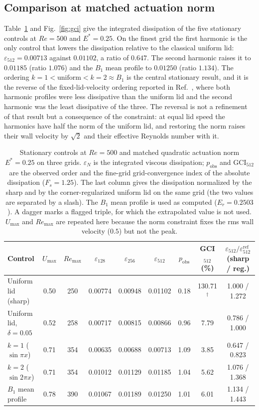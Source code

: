 \documentclass[11pt,a4paper]{article}
\begin{document}
\subsection{Comparison at matched actuation norm}

Table~\ref{tab:stationary} and Fig.~\ref{fig:gci} give the integrated dissipation
of the five stationary controls at $Re=500$ and $E^\ast=0.25$. On the finest grid
the first harmonic is the only control that lowers the dissipation relative to the
classical uniform lid: $\varepsilon_{512}=0.00713$ against
$0.01102$, a ratio of $0.647$. The second harmonic raises it to $0.01185$
(ratio $1.076$) and the $B_1$ mean profile to $0.01250$ (ratio $1.134$). The
ordering $k=1<\text{uniform}<k=2\approx B_1$ is the central stationary result, and
it is the reverse of the fixed-lid-velocity ordering reported in
Ref.~\cite{beniaiche2026}, where both harmonic profiles were less dissipative than
the uniform lid and the second harmonic was the least dissipative of the three.
The reversal is not a refinement of that result but a consequence of the
constraint: at equal lid speed the harmonics have half the norm of the uniform
lid, and restoring the norm raises their wall velocity by $\sqrt2$ and their
effective Reynolds number with it.

\begin{table}[t]
\centering
\caption{Stationary controls at $Re=500$ and matched quadratic actuation norm
$E^\ast=0.25$ on three grids. $\varepsilon_N$ is the integrated viscous
dissipation; $p_{\mathrm{obs}}$ and $\mathrm{GCI}_{512}$ are the observed order
and the fine-grid grid-convergence index of the absolute dissipation
($F_s=1.25$). The last column gives the dissipation normalized by the sharp
and by the corner-regularized uniform lid on the same grid (the two values are
separated by a slash). The $B_1$ mean profile
is used as computed ($E_r=0.2503$). A dagger marks a flagged triple, for which
the extrapolated value is not used. $U_{\max}$ and $Re_{\max}$ are repeated here
because the norm constraint fixes the rms wall velocity ($0.5$) but not the peak.}
\label{tab:stationary}
\footnotesize
\setlength{\tabcolsep}{4pt}
\begin{tabular}{lcccccccc}
\toprule
Control & $U_{\max}$ & $Re_{\max}$ & $\varepsilon_{128}$ & $\varepsilon_{256}$ & $\varepsilon_{512}$
& $p_{\mathrm{obs}}$ & GCI$_{512}$ (\%) & $\varepsilon_{512}/\varepsilon^{\mathrm{ref}}_{512}$ (sharp / reg.)\\
\midrule
Uniform lid (sharp) & 0.50 & 250 & 0.00774 & 0.00948 & 0.01102 & 0.18 & 130.71$^{\dagger}$ & 1.000 / 1.272\\
Uniform lid, $\delta=0.05$ & 0.52 & 258 & 0.00717 & 0.00815 & 0.00866 & 0.96 & 7.79 & 0.786 / 1.000\\
$k=1$ ($\sin\pi x$) & 0.71 & 354 & 0.00635 & 0.00688 & 0.00713 & 1.09 & 3.85 & 0.647 / 0.823\\
$k=2$ ($\sin 2\pi x$) & 0.71 & 354 & 0.01012 & 0.01129 & 0.01185 & 1.04 & 5.62 & 1.076 / 1.368\\
$B_1$ mean profile & 0.78 & 390 & 0.01067 & 0.01189 & 0.01250 & 1.01 & 6.01 & 1.134 / 1.443\\
\bottomrule
\end{tabular}
\end{table}
\end{document}

